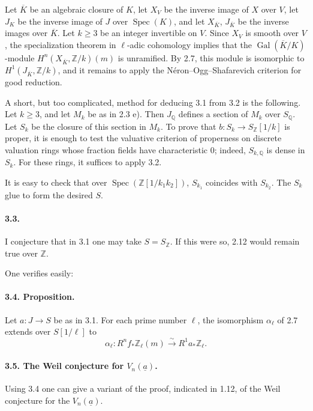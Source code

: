 \documentclass[10pt]{article}
\newcommand{\Q}{\mathbb Q}
\newcommand{\Z}{\mathbb Z}
\newcommand{\Spec}{\operatorname{Spec}}
\newcommand{\Gal}{\operatorname{Gal}}
\newcommand{\iso}{\xrightarrow{\sim}}
\begin{document}
Let \(\overline K\) be an algebraic closure of \(K\), let \(X_V\) be the inverse image of \(X\) over \(V\), let \(J_K\) be the inverse image of \(J\) over \(\Spec(K)\), and let \(X_{\overline K}\), \(J_{\overline K}\) be the inverse images over \(\overline K\). Let \(k\ge3\) be an integer invertible on \(V\). Since \(X_V\) is smooth over \(V\), the specialization theorem in \(\ell\)-adic cohomology implies that the \(\Gal(\overline K/K)\)-module \(H^n(X_{\overline K},\Z/k)(m)\) is unramified. By 2.7, this module is isomorphic to \(H^1(J_{\overline K},\Z/k)\), and it remains to apply the Néron--Ogg--Shafarevich criterion for good reduction.

A short, but too complicated, method for deducing 3.1 from 3.2 is the following. Let \(k\ge3\), and let \(M_k\) be as in 2.3 e). Then \(J_\Q\) defines a section of \(M_k\) over \(S_\Q\). Let \(S_k\) be the closure of this section in \(M_k\). To prove that \(b:S_k\to S_\Z[1/k]\) is proper, it is enough to test the valuative criterion of properness on discrete valuation rings whose fraction fields have characteristic \(0\); indeed, \(S_{k,\Q}\) is dense in \(S_k\). For these rings, it suffices to apply 3.2.

It is easy to check that over \(\Spec(\Z[1/k_1k_2])\), \(S_{k_1}\) coincides with \(S_{k_2}\). The \(S_k\) glue to form the desired \(S\).

\paragraph{3.3.} I conjecture that in 3.1 one may take \(S=S_\Z\). If this were so, 2.12 would remain true over \(\Z\).

One verifies easily:

\paragraph{3.4. Proposition.} Let \(a:J\to S\) be as in 3.1. For each prime number \(\ell\), the isomorphism \(\alpha_\ell\) of 2.7 extends over \(S[1/\ell]\) to
\[
\alpha_\ell:R^nf_*\Z_\ell(m)\iso R^1a_*\Z_\ell.
\]

\paragraph{3.5. The Weil conjecture for \(V_n(\underline a)\).} Using 3.4 one can give a variant of the proof, indicated in 1.12, of the Weil conjecture for the \(V_n(\underline a)\).
\end{document}
